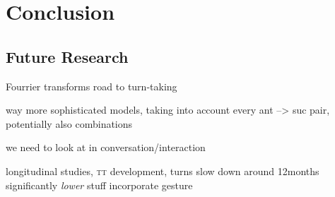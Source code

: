 
\chapter{Conclusion}
\label{ch:con}
\section{Future Research}
\label{sec:confut}
Fourrier transforms
road to turn-taking

way more sophisticated models, taking into account every ant --> suc pair, potentially also combinations

we need to look at \rt in conversation/interaction

longitudinal studies, \textsc{tt} development, turns slow down around 12months \citep{hilbrink_early_2015}
significantly \emph{lower} stuff
incorporate gesture